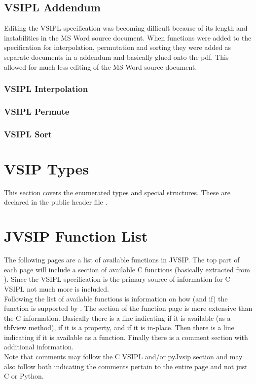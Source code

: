 \subsection*{VSIPL Addendum}
Editing the VSIPL specification was becoming difficult because of its length and instabilities in the MS Word source document. When functions were added to the specification for interpolation, permutation and sorting they were added as separate documents in a addendum and basically glued onto the pdf. This allowed for much less editing of the MS Word source document.
\subsubsection*{VSIPL Interpolation}
\subsubsection*{VSIPL Permute}
\subsubsection*{VSIPL Sort}
%
\section*{VSIP Types}
This section covers the enumerated types and special structures. These are declared in the public header file .
%
\section*{JVSIP Function List}
The following pages are a list of available functions in JVSIP. The top part of each page will include a section of available C functions (basically extracted from ). Since the VSIPL specification is the primary source of information for C VSIPL not much more is included.\\
%
Following the list of available functions is information on how (and if) the function is supported by \pyjv. The \pyjv section of the function page is more extensive than the C information. Basically there is a line indicating if it is available (as a 	tbf{view} method), if it is a property, and if it is in-place. Then there is a line indicating if it is available as a \pyjv function. Finally there is a comment section with additional information.\\
%
Note that comments may follow the C VSIPL and/or pyJvsip section and may also follow both indicating the comments pertain to the entire page and not just C or Python.\\
%
